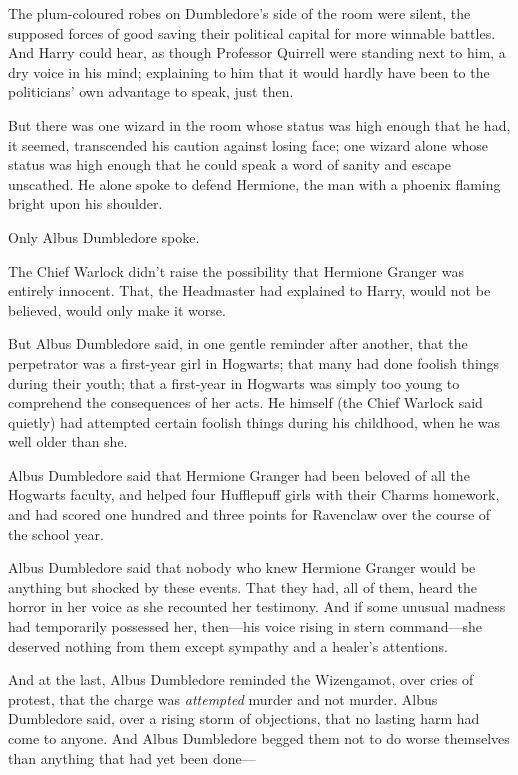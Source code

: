 The plum-coloured robes on Dumbledore's side of the room were silent,
the supposed forces of good saving their political capital for more
winnable battles. And Harry could hear, as though Professor Quirrell
were standing next to him, a dry voice in his mind; explaining to him
that it would hardly have been to the politicians' own advantage to
speak, just then.

But there was one wizard in the room whose status was high enough that
he had, it seemed, transcended his caution against losing face; one
wizard alone whose status was high enough that he could speak a word of
sanity and escape unscathed. He alone spoke to defend Hermione, the man
with a phoenix flaming bright upon his shoulder.

Only Albus Dumbledore spoke.

The Chief Warlock didn't raise the possibility that Hermione Granger was
entirely innocent. That, the Headmaster had explained to Harry, would
not be believed, would only make it worse.

But Albus Dumbledore said, in one gentle reminder after another, that
the perpetrator was a first-year girl in Hogwarts; that many had done
foolish things during their youth; that a first-year in Hogwarts was
simply too young to comprehend the consequences of her acts. He himself
(the Chief Warlock said quietly) had attempted certain foolish things
during his childhood, when he was well older than she.

Albus Dumbledore said that Hermione Granger had been beloved of all the
Hogwarts faculty, and helped four Hufflepuff girls with their Charms
homework, and had scored one hundred and three points for Ravenclaw over
the course of the school year.

Albus Dumbledore said that nobody who knew Hermione Granger would be
anything but shocked by these events. That they had, all of them, heard
the horror in her voice as she recounted her testimony. And if some
unusual madness had temporarily possessed her, then---his voice rising
in stern command---she deserved nothing from them except sympathy and a
healer's attentions.

And at the last, Albus Dumbledore reminded the Wizengamot, over cries of
protest, that the charge was \emph{attempted} murder and not murder.
Albus Dumbledore said, over a rising storm of objections, that no
lasting harm had come to anyone. And Albus Dumbledore begged them not to
do worse themselves than anything that had yet been done---

